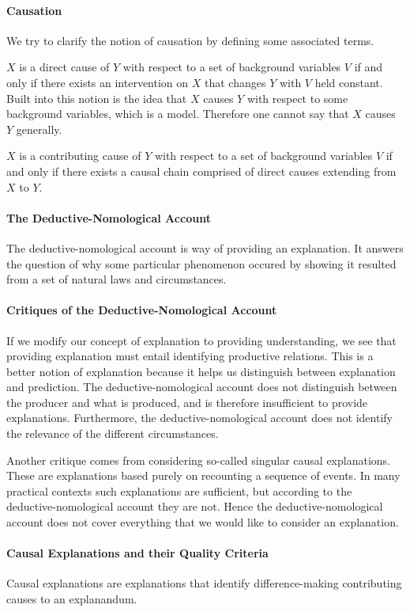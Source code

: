 \paragraph{Causation}
We try to clarify the notion of causation by defining some associated terms.

$X$ is a direct cause of $Y$ with respect to a set of background variables $V$ if and only if there exists an intervention on $X$ that changes $Y$ with $V$ held constant. Built into this notion is the idea that $X$ causes $Y$ with respect to some background variables, which is a model. Therefore one cannot say that $X$ causes $Y$ generally.

$X$ is a contributing cause of $Y$ with respect to a set of background variables $V$ if and only if there exists a causal chain comprised of direct causes extending from $X$ to $Y$.

\paragraph{The Deductive-Nomological Account}
The deductive-nomological account is way of providing an explanation. It answers the question of why some particular phenomenon occured by showing it resulted from a set of natural laws and circumstances.

\paragraph{Critiques of the Deductive-Nomological Account}
If we modify our concept of explanation to providing understanding, we see that providing explanation must entail identifying productive relations. This is a better notion of explanation because it helps us distinguish between explanation and prediction. The deductive-nomological account does not distinguish between the producer and what is produced, and is therefore insufficient to provide explanations. Furthermore, the deductive-nomological account does not identify the relevance of the different circumstances.

Another critique comes from considering so-called singular causal explanations. These are explanations based purely on recounting a sequence of events. In many practical contexts such explanations are sufficient, but according to the deductive-nomological account they are not. Hence the deductive-nomological account does not cover everything that we would like to consider an explanation.

\paragraph{Causal Explanations and their Quality Criteria}
Causal explanations are explanations that identify difference-making contributing causes to an explanandum.


